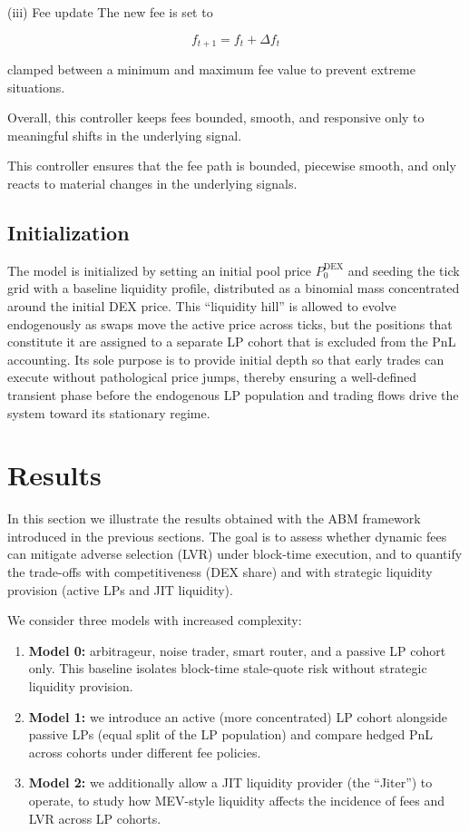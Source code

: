 \documentclass[11pt]{article}
\begin{document}
(iii) Fee update \newline
The new fee is set to

\begin{equation}
    f_{t+1} = f_t + \Delta f_t
\end{equation}

clamped between a minimum and maximum fee value to prevent extreme situations.

Overall, this controller keeps fees bounded, smooth, and responsive only to meaningful shifts in the underlying signal.

This controller ensures that the fee path is bounded, piecewise smooth, and only reacts to material changes in the underlying signals.

\subsection{Initialization}
The model is initialized by setting an initial pool price $P^{\mathrm{DEX}}_0$ and seeding the tick grid with a baseline liquidity profile, distributed as a binomial mass concentrated around the initial DEX price. This “liquidity hill” is allowed to evolve endogenously as swaps move the active price across ticks, but the positions that constitute it are assigned to a separate LP cohort that is excluded from the PnL accounting. Its sole purpose is to provide initial depth so that early trades can execute without pathological price jumps, thereby ensuring a well-defined transient phase before the endogenous LP population and trading flows drive the system toward its stationary regime.

\section{Results}
\label{sec:results}

In this section we illustrate the results obtained with the ABM framework introduced in the previous sections. The goal 
is to assess whether dynamic fees can mitigate adverse selection (LVR) under block-time execution, and to quantify the 
trade-offs with competitiveness (DEX share) and with strategic liquidity provision (active LPs and JIT liquidity).

We consider three models with increased complexity:
\begin{enumerate}
    \item \textbf{Model 0:} arbitrageur, noise trader, smart router, and a passive LP cohort only. This baseline isolates 
    block-time stale-quote risk without strategic liquidity provision.
    \item \textbf{Model 1:} we introduce an active (more concentrated) LP cohort alongside passive LPs (equal split of 
    the LP population) and compare hedged PnL across cohorts under different fee policies.
    \item \textbf{Model 2:} we additionally allow a JIT liquidity provider (the ``Jiter'') to operate, to study how 
    MEV-style liquidity affects the incidence of fees and LVR across LP cohorts.
\end{enumerate}
\end{document}
